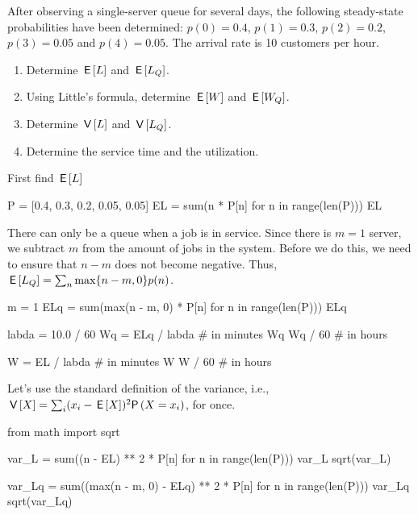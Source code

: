 \documentclass[companion]{subfiles}
\begin{document}
\begin{extra}[Hall 5.2] \label{exer: Hall} 
After observing a single-server queue for several days, the following steady-state probabilities have been determined: $p(0)=0.4$, $p(1) = 0.3$, $p(2)=0.2$, $p(3)=0.05$ and $p(4)=0.05$.
 The arrival rate is 10 customers per hour.
 \begin{enumerate}
 \item Determine $\,\mathsf{E}\left[L\right]$ and $\,\mathsf{E}\left[L_Q\right]$. 
 \item Using Little's formula, determine $\,\mathsf{E}\left[W\right]$ and $\,\mathsf{E}\left[W_Q\right]$.
\item Determine $\,\mathsf{V}\left[L\right]$ and $\,\mathsf{V}\left[L_Q\right]$.
\item Determine the service time and the utilization.
 \end{enumerate}
\begin{solution} First find $\,\mathsf{E}\left[L\right]$


\begin{pyconsole}
P = [0.4, 0.3, 0.2, 0.05, 0.05]
EL = sum(n * P[n] for n in range(len(P)))
EL
\end{pyconsole}

There can only be a queue when a job is in service. Since there is
$m=1$ server, we subtract $m$ from the amount of jobs in the system.
Before we do this, we need to ensure that $n-m$ does not become
negative. Thus, $\,\mathsf{E}\left[L_Q\right] = \sum_n \max\{n-m, 0\} p(n)$.

\begin{pyconsole}
m = 1
ELq = sum(max(n - m, 0) * P[n] for n in range(len(P)))
ELq
\end{pyconsole}


\begin{pyconsole}
labda = 10.0 / 60
Wq = ELq / labda  # in minutes
Wq
Wq / 60  # in hours

W = EL / labda  # in minutes
W
W / 60  # in hours
\end{pyconsole}

Let's use the standard definition of the variance, i.e., $\V X = \sum_{i} (x_i-\E X)^2 \P{X=x_i}$, for once.

\begin{pyconsole}
from math import sqrt

var_L = sum((n - EL) ** 2 * P[n] for n in range(len(P)))
var_L
sqrt(var_L)
\end{pyconsole}


\begin{pyconsole}
var_Lq = sum((max(n - m, 0) - ELq) ** 2 * P[n] for n in range(len(P)))
var_Lq
sqrt(var_Lq)
\end{pyconsole}



\end{solution}
\end{extra}
\end{document}

